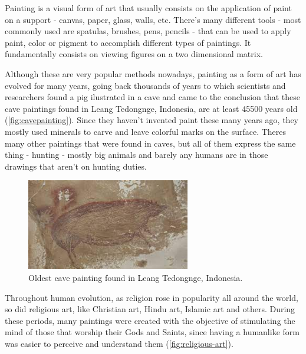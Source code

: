 \documentclass{report}
\begin{document}
Painting is a visual form of art that usually consists on the application of paint on a support - canvas, paper, glass, walls, etc. There's many different tools - most commonly used are spatulas, brushes, pens, pencils - that can be used to apply paint, color or pigment to accomplish different types of paintings. It fundamentally consists on viewing figures on a two dimensional matrix. 

Although these are very popular methods nowadays, painting as a form of art has evolved for many years, going back thousands of years to which scientists and researchers found a pig ilustrated in a cave and came to the conclusion that these cave paintings found in Leang Tedongnge, Indonesia, are at least 45500 years old (\autoref{fig:cavepainting}). Since they haven't invented paint these many years ago, they mostly used minerals to carve and leave colorful marks on the surface. Theres many other paintings that were found in caves, but all of them express the same thing - hunting - mostly big animals and barely any humans are in those drawings that aren't on hunting duties.

\begin{figure}[h]
\center
\includegraphics[height=4cm]{img/cavepainting}
\caption{Oldest cave painting found in Leang Tedongnge, Indonesia.}
\label{fig:cavepainting}
\end{figure}

Throughout human evolution, as religion rose in popularity all around the world, so did religious art, like Christian art, Hindu art, Islamic art and others. During these periods, many paintings were created with the objective of stimulating the mind of those that worship their Gods and Saints, since having a humanlike form was easier to perceive and understand them (\autoref{fig:religious-art}).
\end{document}
